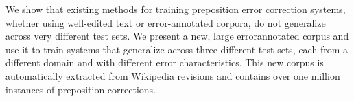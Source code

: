 We show that existing methods for training preposition error correction systems, whether using well-edited text or error-annotated corpora, do not
 generalize across very different test sets. We present a new, large
 errorannotated corpus and use it to train systems that generalize across three
 different test sets, each from a different domain and with different error
 characteristics. This new corpus is automatically extracted from Wikipedia
 revisions and contains over one million instances of preposition corrections.

